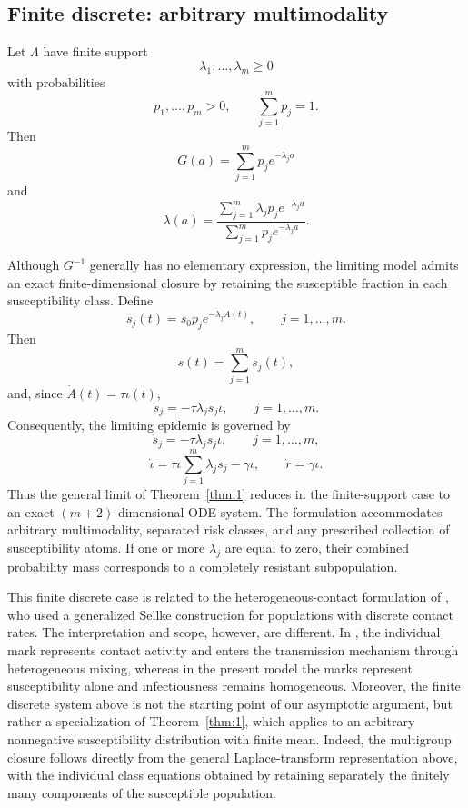 \documentclass[pdflatex,sn-mathphys-ay]{sn-jnl}
\theoremstyle{thmstyleone}
\theoremstyle{thmstyletwo}
\theoremstyle{thmstylethree}
\begin{document}
\subsection{Finite discrete: arbitrary multimodality}

Let \(\Lambda\) have finite support
\[
\lambda_1,\ldots,\lambda_m\geq 0
\]
with probabilities
\[
p_1,\ldots,p_m>0,
\qquad
\sum_{j=1}^m p_j=1.
\]
Then
\[
G(a)=\sum_{j=1}^m p_j e^{-\lambda_j a}
\]
and
\[
\overline{\lambda}(a)
=
\frac{\sum_{j=1}^m \lambda_j p_j e^{-\lambda_j a}}
{\sum_{j=1}^m p_j e^{-\lambda_j a}}.
\]

Although \(G^{-1}\) generally has no elementary expression, the limiting model
admits an exact finite-dimensional closure by retaining the susceptible fraction
in each susceptibility class. Define
\[
s_j(t)=s_0 p_j e^{-\lambda_j A(t)},
\qquad j=1,\ldots,m.
\]
Then
\[
s(t)=\sum_{j=1}^m s_j(t),
\]
and, since \(\dot A(t)=\tau\iota(t)\),
\[
\dot s_j
=
-\tau\lambda_j s_j\iota,
\qquad j=1,\ldots,m.
\]
Consequently, the limiting epidemic is governed by
\[
\dot s_j
=
-\tau\lambda_j s_j\iota,
\qquad j=1,\ldots,m,
\]
\[
\dot\iota
=
\tau\iota\sum_{j=1}^m \lambda_j s_j
-\gamma\iota,
\qquad
\dot r=\gamma\iota.
\]
Thus the general limit of Theorem~\ref{thm:1} reduces in the finite-support
case to an exact \((m+2)\)-dimensional ODE system. The formulation accommodates
arbitrary multimodality, separated risk classes, and any prescribed collection
of susceptibility atoms. If one or more \(\lambda_j\) are equal to zero, their
combined probability mass corresponds to a completely resistant subpopulation.

This finite discrete case is related to the heterogeneous-contact formulation
of \citet{House2014}, who used a generalized Sellke construction for populations
with discrete contact rates. The interpretation and scope, however, are
different. In \citet{House2014}, the individual mark represents contact activity
and enters the transmission mechanism through heterogeneous mixing, whereas in
the present model the marks represent susceptibility alone and infectiousness
remains homogeneous. Moreover, the finite discrete system above is not the
starting point of our asymptotic argument, but rather a specialization of
Theorem~\ref{thm:1}, which applies to an arbitrary nonnegative susceptibility
distribution with finite mean. Indeed, the multigroup closure follows directly
from the general Laplace-transform representation above,  
with the individual class equations obtained by retaining separately the
finitely many components of the susceptible population.
\end{document}
